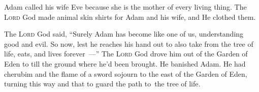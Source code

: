\begin{inparaenum}
    
    
    
     Adam called his wife Eve because she is the mother of every living thing.%
     The \textsc{Lord} God made animal skin shirts for Adam and his wife, and He clothed them.%
    
     The \textsc{Lord} God said, ``Surely Adam has become like one of us, understanding good and evil. So now, lest he reaches his hand out to also take from the tree of life, eats, and lives forever~---''%
     The \textsc{Lord} God drove him out of the Garden of Eden to till the ground where he'd been brought.%
     He banished Adam. He had cherubim and the flame of a sword sojourn to the east of the Garden of Eden, turning this way and that to guard the path to\understood\ the tree of life.%
\end{inparaenum}
